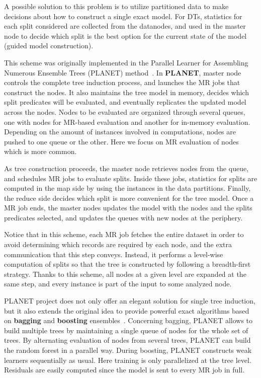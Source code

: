 \documentclass[3p,review]{elsarticle}
\begin{document}
	A possible solution to this problem is to utilize partitioned data to make decisions about how to construct a single exact model. For DTs, statistics for each split considered are collected from the datanodes, and used in the master node to decide which split is the best option for the current state of the model (guided model construction).
	
	This scheme was originally implemented in the Parallel Learner for Assembling Numerous Ensemble Trees (PLANET) method~\cite{panda09}. In \textbf{PLANET}, master node controls the complete tree induction process, and launches the MR jobs that construct the nodes. It also maintains the tree model in memory, decides which split predicates will be evaluated, and eventually replicates the updated model across the nodes. Nodes to be evaluated are organized through several queues, one with nodes for MR-based evaluation and another for in-memory evaluation. Depending on the amount of instances involved in computations, nodes are pushed to one queue or the other. Here we focus on MR evaluation of nodes which is more common.
	
	As tree construction proceeds, the master node retrieves nodes from the queue, and schedules MR jobs to evaluate splits. Inside these jobs, statistics for splits are computed in the map side by using the instances in the data partitions. Finally, the reduce side decides which split is more convenient for the tree model. Once a MR job ends, the master nodes updates the model with the nodes and the splits predicates selected, and updates the queues with new nodes at the periphery.
	
	Notice that in this scheme, each MR job fetches the entire dataset in order to avoid determining which records are required by each node, and the extra communication that this step conveys. Instead, it performs a level-wise computation of splits so that the tree is constructed by following a breadth-first strategy. Thanks to this scheme, all nodes at a given level are expanded at the same step, and every instance is part of the input to some analyzed node.
	
	PLANET project does not only offer an elegant solution for single tree induction, but it also extends the original idea to provide powerful exact algorithms based on \textbf{bagging} and \textbf{boosting} ensembles~\cite{hastie11}. Concerning bagging, PLANET allows to build multiple trees by maintaining a single queue of nodes for the whole set of trees. By alternating evaluation of nodes from several trees, PLANET can build the random forest in a parallel way. During boosting, PLANET constructs weak learners sequentially as usual. Here training is only parallelized at the tree level. Residuals are easily computed since the model is sent to every MR job in full.
	
\end{document}

